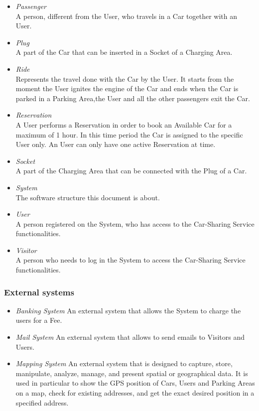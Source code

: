 \begin{itemize}
	\item \emph{Passenger}\\
	A person, different from the User, who travels in a Car together with an User. 

	\item \emph{Plug}\\
	A part of the Car that can be inserted in a Socket of a Charging Area.

	\item \emph{Ride}\\
	Represents the travel done with the Car by the User. It starts from the moment the User ignites the engine of the Car and ends when the Car is parked in a Parking Area,the User and all the other passengers exit the Car.

	\item \emph{Reservation}\\
	A User performs a Reservation in order to book an Available Car for a maximum of 1 hour. In this time period the Car is assigned to the specific User only. An User can only have one active Reservation at time.

	\item \emph{Socket}\\
	A part of the Charging Area that can be connected with the Plug of a Car. 

	\item \emph{System}\\
	The software structure this document is about.

	\item \emph{User}\\
	A person registered on the System, who has access to the Car-Sharing Service functionalities.

	\item \emph{Visitor}\\
	A person who needs to log in the System to access the Car-Sharing Service functionalities.
\end{itemize}

\subsubsection{External systems}
\begin{itemize}
	\item \emph{Banking System}
	An external system that allows the System to charge the users for a Fee.
	
	\item \emph{Mail System}
	An external system that allows to send emails to Visitors and Users.

	\item \emph{Mapping System}
	An external system that is designed to capture, store, manipulate, analyze, manage, and present spatial or geographical data. 
	It is used in particular to show the GPS position of Cars, Users and Parking Areas on a map, check for existing addresses, and get the exact desired position in a specified address.
	
\end{itemize}

